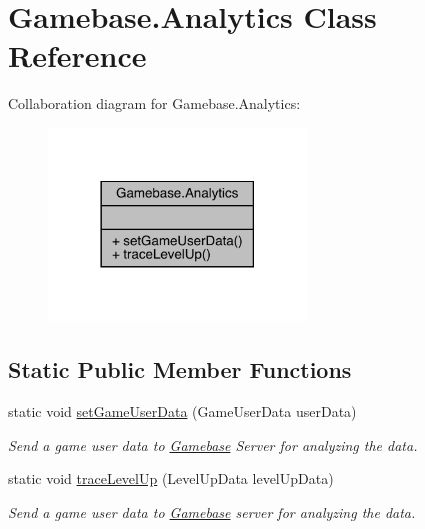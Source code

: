 \hypertarget{classcom_1_1toast_1_1android_1_1gamebase_1_1_gamebase_1_1_analytics}{}\section{Gamebase.\+Analytics Class Reference}
\label{classcom_1_1toast_1_1android_1_1gamebase_1_1_gamebase_1_1_analytics}


Collaboration diagram for Gamebase.\+Analytics\+:
\nopagebreak
\begin{figure}[H]
\begin{center}
\leavevmode
\includegraphics[width=194pt]{classcom_1_1toast_1_1android_1_1gamebase_1_1_gamebase_1_1_analytics__coll__graph}
\end{center}
\end{figure}
\subsection*{Static Public Member Functions}
\begin{DoxyCompactItemize}
\item 
static void \hyperlink{classcom_1_1toast_1_1android_1_1gamebase_1_1_gamebase_1_1_analytics_a2f339ad8d77890e3521e292bf84284ae}{set\+Game\+User\+Data} (Game\+User\+Data user\+Data)
\begin{DoxyCompactList}\small\item\em Send a game user data to \hyperlink{classcom_1_1toast_1_1android_1_1gamebase_1_1_gamebase}{Gamebase} Server for analyzing the data. \end{DoxyCompactList}\item 
static void \hyperlink{classcom_1_1toast_1_1android_1_1gamebase_1_1_gamebase_1_1_analytics_aa814a3056950011e47c8d7fcc83624b6}{trace\+Level\+Up} (Level\+Up\+Data level\+Up\+Data)
\begin{DoxyCompactList}\small\item\em Send a game user data to \hyperlink{classcom_1_1toast_1_1android_1_1gamebase_1_1_gamebase}{Gamebase} server for analyzing the data. \end{DoxyCompactList}\end{DoxyCompactItemize}



